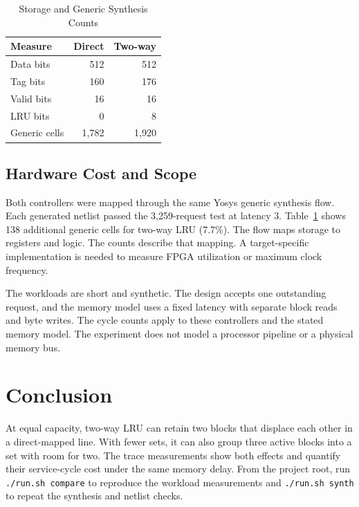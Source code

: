 \begin{table}[!t]
\caption{Storage and Generic Synthesis Counts}
\label{tab:synth}
\centering
\begin{tabular}{lrr}
\toprule
Measure & Direct & Two-way\\
\midrule
Data bits & 512 & 512\\
Tag bits & 160 & 176\\
Valid bits & 16 & 16\\
LRU bits & 0 & 8\\
Generic cells & 1,782 & 1,920\\
\bottomrule
\end{tabular}
\end{table}

\newpage
\subsection{Hardware Cost and Scope}
Both controllers were mapped through the same Yosys generic synthesis
flow. Each generated netlist passed the 3,259-request test at latency 3.
Table~\ref{tab:synth} shows 138 additional generic cells for two-way LRU
(7.7\%). The flow maps storage to registers and logic. The counts
describe that mapping. A target-specific implementation is needed to
measure FPGA utilization or maximum clock frequency.

The workloads are short and synthetic. The design accepts one outstanding
request, and the memory model uses a fixed latency with separate block
reads and byte writes. The cycle counts apply to these controllers
and the stated memory model. The experiment does not model a processor
pipeline or a physical memory bus.

\section{Conclusion}
At equal capacity, two-way LRU can retain two blocks that displace each
other in a direct-mapped line. With fewer sets, it can also group three
active blocks into a set with room for two. The trace measurements show
both effects and quantify their service-cycle cost under the same memory
delay. From the project root, run \texttt{./run.sh compare} to
reproduce the workload measurements and \texttt{./run.sh synth} to
repeat the synthesis and netlist checks.


